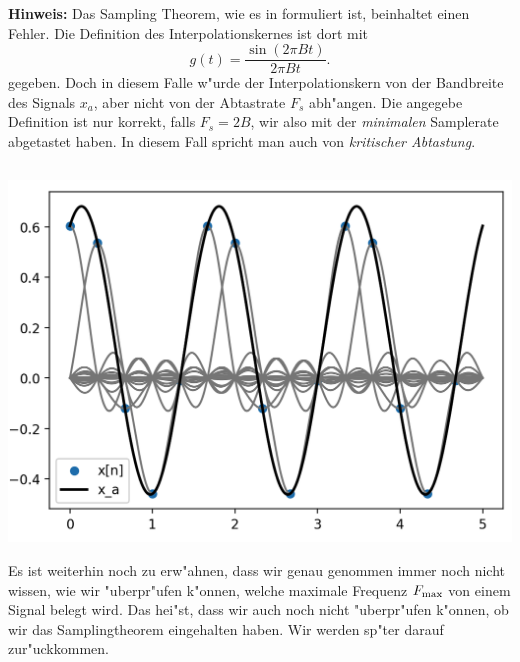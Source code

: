 \textbf{Hinweis:} Das Sampling Theorem, wie es in \cite{proakis2013} formuliert ist, beinhaltet einen Fehler. Die Definition des Interpolationskernes ist dort mit
\[
g(t) = \frac{\sin(2 \pi B t)}{2 \pi B t}.
\]
gegeben. Doch in diesem Falle w"urde der Interpolationskern von der Bandbreite des Signals $x_a$, aber nicht von der Abtastrate $F_s$ abh"angen. 
Die angegebe Definition ist nur korrekt, falls $F_s = 2 B$, wir also mit der \emph{minimalen} Samplerate abgetastet haben.
In diesem Fall spricht man auch von \emph{kritischer Abtastung}.
%
\begin{listing}
    \begin{minipage}{0.49\textwidth}
        \strut\vspace*{-\baselineskip}\newline
        \inputminted[firstline=4]{python3}{code/sampling_theorem.py}
    \end{minipage}
    \begin{minipage}{0.49\textwidth}
        \strut\vspace*{-\baselineskip}\newline
        \includegraphics[width=\textwidth]{code/sampling_theorem.png}
    \end{minipage}
    \label{py:sampling_theorem}
\end{listing}

Es ist weiterhin noch zu erw"ahnen, dass wir genau genommen immer noch nicht wissen, wie wir "uberpr"ufen k"onnen, welche maximale Frequenz $F_{\rm max}$ von einem Signal belegt wird. 
Das hei"st, dass wir auch noch nicht "uberpr"ufen k"onnen, ob wir das Samplingtheorem eingehalten haben.
Wir werden sp"ter darauf zur"uckkommen.
\FloatBarrier